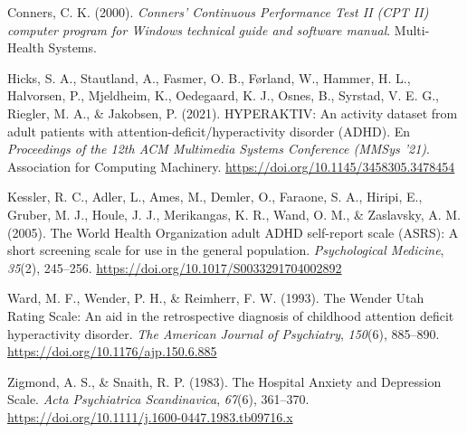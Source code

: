 \documentclass[11pt,letterpaper]{article}
\newenvironment{aparefs}{%
  \par\begingroup
  \setlength{\parindent}{0pt}%
  \setlength{\parskip}{0.55em}%
  \everypar{\hangindent=1.27cm \hangafter=1}%
}{\par\endgroup}
\begin{document}
\begin{aparefs}
Conners, C. K. (2000). \textit{Conners' Continuous Performance Test II (CPT II) computer program for Windows technical guide and software manual}. Multi-Health Systems.

Hicks, S. A., Stautland, A., Fasmer, O. B., F\o{}rland, W., Hammer, H. L., Halvorsen, P., Mjeldheim, K., Oedegaard, K. J., Osnes, B., Syrstad, V. E. G., Riegler, M. A., \& Jakobsen, P. (2021). HYPERAKTIV: An activity dataset from adult patients with attention-deficit/hyperactivity disorder (ADHD). En \textit{Proceedings of the 12th ACM Multimedia Systems Conference (MMSys '21)}. Association for Computing Machinery. \url{https://doi.org/10.1145/3458305.3478454}

Kessler, R. C., Adler, L., Ames, M., Demler, O., Faraone, S. A., Hiripi, E., Gruber, M. J., Houle, J. J., Merikangas, K. R., Wand, O. M., \& Zaslavsky, A. M. (2005). The World Health Organization adult ADHD self-report scale (ASRS): A short screening scale for use in the general population. \textit{Psychological Medicine}, \textit{35}(2), 245--256. \url{https://doi.org/10.1017/S0033291704002892}

Ward, M. F., Wender, P. H., \& Reimherr, F. W. (1993). The Wender Utah Rating Scale: An aid in the retrospective diagnosis of childhood attention deficit hyperactivity disorder. \textit{The American Journal of Psychiatry}, \textit{150}(6), 885--890. \url{https://doi.org/10.1176/ajp.150.6.885}

Zigmond, A. S., \& Snaith, R. P. (1983). The Hospital Anxiety and Depression Scale. \textit{Acta Psychiatrica Scandinavica}, \textit{67}(6), 361--370. \url{https://doi.org/10.1111/j.1600-0447.1983.tb09716.x}
\end{aparefs}
\end{document}
